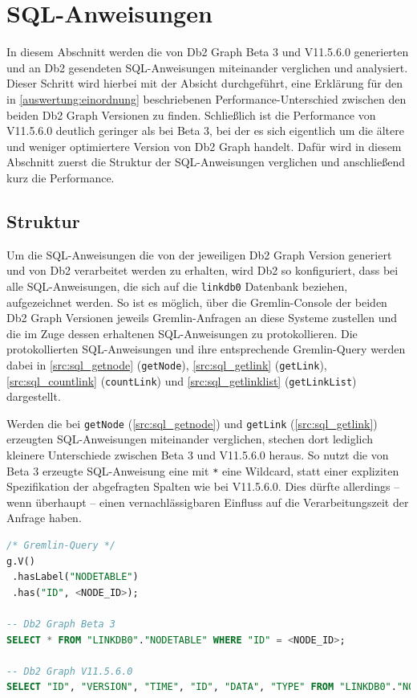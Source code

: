 \section{SQL-Anweisungen}
\label{sql}
In diesem Abschnitt werden die von Db2 Graph Beta 3 und V11.5.6.0 generierten und an Db2 gesendeten SQL-Anweisungen miteinander verglichen und analysiert. Dieser Schritt wird hierbei mit der Absicht durchgeführt, eine Erklärung für den in \autoref{auswertung:einordnung} beschriebenen Performance-Unterschied zwischen den beiden Db2 Graph Versionen zu finden. Schließlich ist die Performance von V11.5.6.0  deutlich geringer als bei Beta 3, bei der es sich eigentlich um die ältere und weniger optimiertere Version von Db2 Graph handelt. Dafür wird in diesem Abschnitt zuerst die Struktur der SQL-Anweisungen verglichen und anschließend kurz die Performance. 

\subsection{Struktur}
\label{sql:struktur}
Um die SQL-Anweisungen die von der jeweiligen Db2 Graph Version generiert und von Db2 verarbeitet werden zu erhalten, wird Db2 so konfiguriert, dass bei alle SQL-Anweisungen, die sich auf die \texttt{linkdb0} Datenbank beziehen, aufgezeichnet werden. So ist es möglich, über die Gremlin-Console der beiden Db2 Graph Versionen jeweils Gremlin-Anfragen an diese Systeme zustellen und die im Zuge dessen erhaltenen SQL-Anweisungen zu protokollieren. Die protokollierten SQL-Anweisungen und ihre entsprechende Gremlin-Query werden dabei in \autoref{src:sql_getnode} (\texttt{getNode}), \autoref{src:sql_getlink} (\texttt{getLink}), \autoref{src:sql_countlink} (\texttt{countLink}) und \autoref{src:sql_getlinklist} (\texttt{getLinkList}) dargestellt.

Werden die bei \texttt{getNode} (\autoref{src:sql_getnode}) und \texttt{getLink} (\autoref{src:sql_getlink}) erzeugten SQL-Anweisungen miteinander verglichen,  stechen dort lediglich kleinere Unterschiede zwischen Beta 3 und V11.5.6.0 heraus. So nutzt die von Beta 3 erzeugte SQL-Anweisung eine mit \texttt{*} eine Wildcard, statt einer expliziten Spezifikation der abgefragten Spalten wie bei V11.5.6.0. Dies dürfte allerdings -- wenn überhaupt -- einen vernachlässigbaren Einfluss auf die Verarbeitungszeit der Anfrage haben.

\begin{lstlisting}[caption={Generierter SQL-Code getNode},label=src:sql_getnode,language=SQL]
/* Gremlin-Query */
g.V()
 .hasLabel("NODETABLE")
 .has("ID", <NODE_ID>);

-- Db2 Graph Beta 3
SELECT * FROM "LINKDB0"."NODETABLE" WHERE "ID" = <NODE_ID>;

-- Db2 Graph V11.5.6.0
SELECT "ID", "VERSION", "TIME", "ID", "DATA", "TYPE" FROM "LINKDB0"."NODETABLE" WHERE "ID" = <NODE_ID>;
\end{lstlisting}

